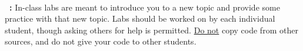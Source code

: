 \footnotesize
~\\ 
\textbf{\laType\ \laAssignment: \laTitle \tab } 
In-class labs are meant to introduce you to a new topic and provide
some practice with that new topic. Labs should be worked on by each
individual student, though asking others for help is permitted.
\underline{Do not} copy code from other sources, and do not give your
code to other students.

\hrulefill
\normalsize 
